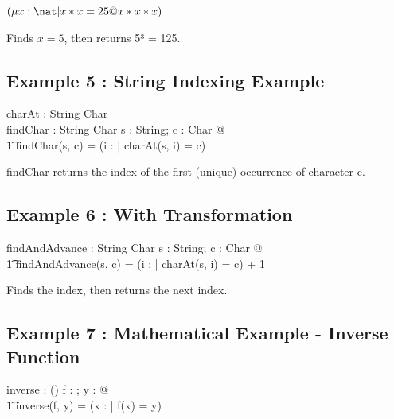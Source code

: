 \documentclass[a4paper,10pt,fleqn]{article}
\begin{document}
\noindent
$(\mu x : \nat | x * x = 25 @ x * x * x)$


\noindent Finds $x = 5$, then returns 5³ = 125.

\bigskip

\subsection*{Example 5 : String Indexing Example}

\begin{zed}
\end{zed}

\begin{axdef}
charAt : String \cross \nat \fun Char \\
findChar : String \cross Char \fun \nat
\where
\forall s : String; c : Char @ \\
\t1 findChar(s, c) = (\mu i : \nat | charAt(s, i) = c)
\end{axdef}

\noindent findChar returns the index of the first (unique) occurrence of character c.

\bigskip

\subsection*{Example 6 : With Transformation}

\begin{axdef}
findAndAdvance : String \cross Char \fun \nat
\where
\forall s : String; c : Char @ \\
\t1 findAndAdvance(s, c) = (\mu i : \nat | charAt(s, i) = c) + 1
\end{axdef}

\noindent Finds the index, then returns the next index.

\bigskip

\subsection*{Example 7 : Mathematical Example - Inverse Function}

\begin{axdef}
inverse : (\nat \fun \nat) \cross \nat \fun \nat
\where
\forall f : \nat \fun \nat; y : \nat @ \\
\t1 inverse(f, y) = (\mu x : \nat | f(x) = y)
\end{axdef}
\end{document}
